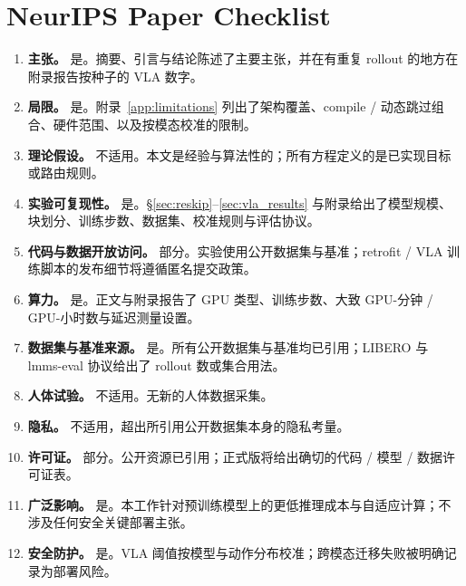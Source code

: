 \documentclass{article}
\begin{document}
\section{NeurIPS Paper Checklist}
\label{app:checklist}
\begin{enumerate}
\item \textbf{主张。} 是。摘要、引言与结论陈述了主要主张，并在有重复 rollout 的地方在附录报告按种子的 VLA 数字。
\item \textbf{局限。} 是。附录~\ref{app:limitations} 列出了架构覆盖、compile / 动态跳过组合、硬件范围、以及按模态校准的限制。
\item \textbf{理论假设。} 不适用。本文是经验与算法性的；所有方程定义的是已实现目标或路由规则。
\item \textbf{实验可复现性。} 是。\S\ref{sec:reskip}--\ref{sec:vla_results} 与附录给出了模型规模、块划分、训练步数、数据集、校准规则与评估协议。
\item \textbf{代码与数据开放访问。} 部分。实验使用公开数据集与基准；retrofit / VLA 训练脚本的发布细节将遵循匿名提交政策。
\item \textbf{算力。} 是。正文与附录报告了 GPU 类型、训练步数、大致 GPU-分钟 / GPU-小时数与延迟测量设置。
\item \textbf{数据集与基准来源。} 是。所有公开数据集与基准均已引用；LIBERO 与 lmms-eval 协议给出了 rollout 数或集合用法。
\item \textbf{人体试验。} 不适用。无新的人体数据采集。
\item \textbf{隐私。} 不适用，超出所引用公开数据集本身的隐私考量。
\item \textbf{许可证。} 部分。公开资源已引用；正式版将给出确切的代码 / 模型 / 数据许可证表。
\item \textbf{广泛影响。} 是。本工作针对预训练模型上的更低推理成本与自适应计算；不涉及任何安全关键部署主张。
\item \textbf{安全防护。} 是。VLA 阈值按模型与动作分布校准；跨模态迁移失败被明确记录为部署风险。
\end{enumerate}
\end{document}

